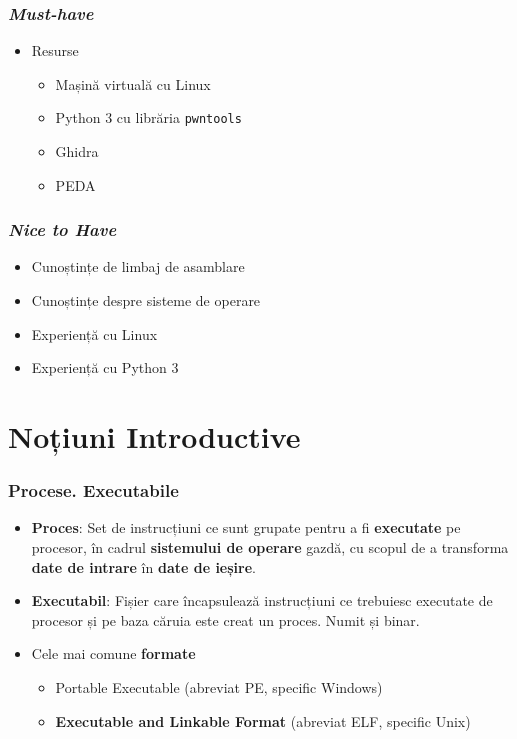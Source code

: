 \documentclass[xcolor={table}]{beamer}
\begin{document}
	\begin{frame}
		\frametitle{\textit{Must-have}}\pause
		\begin{itemize}[<+->]
		    \item Resurse
		        \begin{itemize}
    				\item Mașină virtuală cu Linux
    				\item Python 3 cu librăria \texttt{pwntools}
    				\item Ghidra
    				\item PEDA
		        \end{itemize}
		\end{itemize}
	\end{frame}
	
	\begin{frame}
		\frametitle{\textit{Nice to Have}}\pause
		\begin{itemize}[<+->]
			\item Cunoștințe de limbaj de asamblare
			\item Cunoștințe despre sisteme de operare
			\item Experiență cu Linux
			\item Experiență cu Python 3
		\end{itemize}
	\end{frame}
	
	\section{Noțiuni Introductive}
	
	\begin{frame}
		\frametitle{Procese. Executabile}\pause
		\begin{itemize}[<+->]
		    \item \textbf{Proces}: Set de instrucțiuni ce sunt grupate pentru a fi \textbf{executate} pe procesor, în cadrul \textbf{sistemului de operare} gazdă, cu scopul de a transforma \textbf{date de intrare} în \textbf{date de ieșire}.
			\item \textbf{Executabil}: Fișier care încapsulează instrucțiuni ce trebuiesc executate de procesor și pe baza căruia este creat un proces. Numit și binar.
			\item Cele mai comune \textbf{formate}
			    \begin{itemize}
        			\item Portable Executable (abreviat PE, specific Windows)
        			\item \textbf{Executable and Linkable Format} (abreviat ELF, specific Unix)
        		\end{itemize}
		\end{itemize}
	\end{frame}
	
\end{document}
